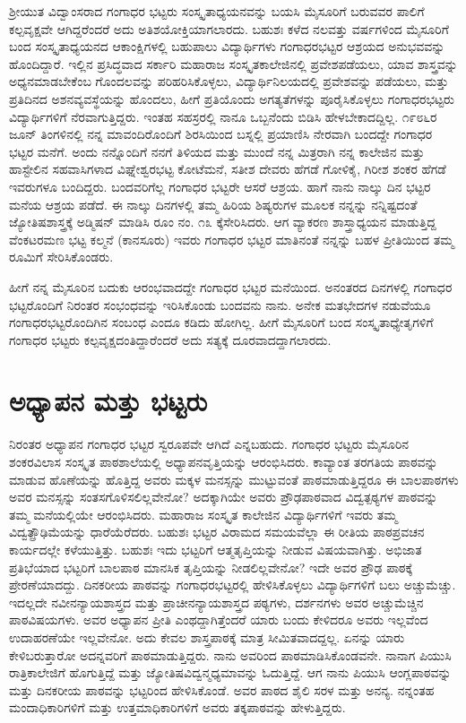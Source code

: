 {ಶ್ರೀಯುತ ವಿದ್ವಾಂಸರಾದ ಗಂಗಾಧರ ಭಟ್ಟರು ಸಂಸ್ಕೃತಾಧ್ಯಯನವನ್ನು ಬಯಸಿ ಮೈಸೂರಿಗೆ ಬರುವವರ ಪಾಲಿಗೆ ಕಲ್ಪವೃಕ್ಷವೇ ಆಗಿದ್ದರೆಂದರೆ ಅದು ಅತಿಶಯೋಕ್ತಿಯಾಗಲಾರದು. ಬಹುಶಃ ಕಳೆದ ನಲವತ್ತು ವರ್ಷಗಳಿಂದ ಮೈಸೂರಿಗೆ ಬಂದ ಸಂಸ್ಕೃತಾಧ್ಯಯನದ ಆಕಾಂಕ್ಷಿಗಳಲ್ಲಿ ಬಹುಪಾಲು ವಿದ್ಯಾರ್ಥಿಗಳು ಗಂಗಾಧರಭಟ್ಟರ ಆಶ್ರಯದ ಅನುಭವವನ್ನು ಹೊಂದಿದ್ದಾರೆ. ಇಲ್ಲಿನ ಪ್ರಸಿದ್ಧವಾದ ಸರ್ಕಾರಿ ಮಹಾರಾಜ ಸಂಸ್ಕೃತಕಾಲೇಜಿನಲ್ಲಿ ಪ್ರವೇಶಪಡೆಯಲು, ಯಾವ ಶಾಸ್ತ್ರವನ್ನು ಅಧ್ಯನಮಾಡಬೇಕೆಂಬ ಗೊಂದಲವನ್ನು ಪರಿಹರಿಸಿಕೊಳ್ಳಲು, ವಿದ್ಯಾರ್ಥಿನಿಲಯದಲ್ಲಿ ಪ್ರವೇಶವನ್ನು ಪಡೆಯಲು, ಮತ್ತು ಪ್ರತಿದಿನದ ಅಶನವ್ಯವಸ್ಥೆಯನ್ನು ಹೊಂದಲು, ಹೀಗೆ ಪ್ರತಿಯೊಂದು ಅಗತ್ಯತೆಗಳನ್ನು ಪೂರೈಸಿಕೊಳ್ಳಲು ಗಂಗಾಧರಭಟ್ಟರು ವಿದ್ಯಾರ್ಥಿಗಳಿಗೆ ನೆರವಾಗುತ್ತಿದ್ದರು. ಇಂತಹ ಸಹಸ್ರರಲ್ಲಿ ನಾನೂ ಒಬ್ಬನೆಂದು ಬಿಡಿಸಿ ಹೇಳಬೇಕಾದದ್ದಿಲ್ಲ. ೧೯೮೬ರ ಜೂನ್ ತಿಂಗಳಿನಲ್ಲಿ ನನ್ನ ಮಾವಂದಿರೊಂದಿಗೆ ಶಿರಸಿಯಿಂದ ಬಸ್ನಲ್ಲಿ ಪ್ರಯಾಣಿಸಿ ನೇರವಾಗಿ ಬಂದದ್ದೇ ಗಂಗಾಧರ ಭಟ್ಟರ ಮನೆಗೆ. ಅಂದು ನನ್ನೊಂದಿಗೆ ನನಗೆ ತಿಳಿಯದ ಮತ್ತು ಮುಂದೆ ನನ್ನ ಮಿತ್ರರಾಗಿ ನನ್ನ ಕಾಲೇಜಿನ ಮತ್ತು ಹಾಸ್ಟೇಲಿನ ಸಹವಾಸಿಗಳಾದ ವಿಘ್ನೇಶ್ವರಭಟ್ಟ ಕೋಟೆಮನೆ, ಸತೀಶ ದೇವರು ಹೆಗಡೆ ಗೋಳಿಕೈ, ಗಿರೀಶ ಶಂಕರ ಹೆಗಡೆ ಇವರುಗಳೂ ಬಂದಿದ್ದರು. ಬಂದವರಿಗೆಲ್ಲ ಗಂಗಾಧರ ಭಟ್ಟರೇ ಆಸರೆ  \enginline{-}  ಆಶ್ರಯ. ಹಾಗೆ ನಾನು ನಾಲ್ಕು ದಿನ ಭಟ್ಟರ ಮನೆಯ ಆಶ್ರಯ ಪಡೆದೆ. ಈ ನಾಲ್ಕು ದಿನಗಳಲ್ಲಿ ತಮ್ಮ ಹಿರಿಯ ಶಿಷ್ಯರುಗಳ ಮೂಲಕ ನನ್ನನ್ನು ನನ್ನಿಷ್ಟದಂತೆ ಜ್ಯೋತಿಷಶಾಸ್ತ್ರಕ್ಕೆ ಅಡ್ಮಿಷನ್ ಮಾಡಿಸಿ ರೂಂ ನಂ. ೧೩ ಕ್ಕೆಸೇರಿಸಿದರು. ಆಗ ವ್ಯಾಕರಣ ಶಾಸ್ತ್ರಾಧ್ಯಯನ ಮಾಡುತ್ತಿದ್ದ ವೆಂಕಟರಮಣ ಭಟ್ಟ ಕಲ್ಮನೆ (ಕಾನಸೂರು) ಇವರು ಗಂಗಾಧರ ಭಟ್ಟರ ಮಾತಿನಂತೆ ನನ್ನನ್ನು ಬಹಳ ಪ್ರೀತಿಯಿಂದ ತಮ್ಮ ರೂಮಿಗೆ ಸೇರಿಸಿಕೊಂಡರು. 

ಹೀಗೆ ನನ್ನ ಮೈಸೂರಿನ ಬದುಕು ಆರಂಭವಾದದ್ದೇ ಗಂಗಾಧರ ಭಟ್ಟರ ಮನೆಯಿಂದ. ಅನಂತರದ ದಿನಗಳಲ್ಲಿ ಗಂಗಾಧರ ಭಟ್ಟರೊಂದಿಗೆ ನಿರಂತರ ಸಂಭಂಧವನ್ನು ಇರಿಸಿಕೊಂಡು ಬಂದವನು ನಾನು. ಅನೇಕ ಮತಭೇದಗಳ ನಡುವೆಯೂ ಗಂಗಾಧರಭಟ್ಟರೊಂದಿಗಿನ ಸಂಬಂಧ ಎಂದೂ ಕಡಿದು ಹೋಗಿಲ್ಲ. ಹೀಗೆ ಮೈಸೂರಿಗೆ ಬಂದ ಸಂಸ್ಕೃತಾಧ್ಯೇತೃಗಳಿಗೆ ಗಂಗಾಧರ ಭಟ್ಟರು ಕಲ್ಪವೃಕ್ಷದಂತಿದ್ದಾರೆಂದರೆ ಅದು ಸತ್ಯಕ್ಕೆ ದೂರವಾದದ್ದಾಗಲಾರದು.

\section*{ಅಧ್ಯಾಪನ ಮತ್ತು ಭಟ್ಟರು}

ನಿರಂತರ ಅಧ್ಯಾಪನ ಗಂಗಾಧರ ಭಟ್ಟರ ಸ್ವರೂಪವೇ ಆಗಿದೆ ಎನ್ನಬಹುದು. ಗಂಗಾಧರ ಭಟ್ಟರು ಮೈಸೂರಿನ ಶಂಕರವಿಲಾಸ ಸಂಸ್ಕೃತ ಪಾಠಶಾಲೆಯಲ್ಲಿ ಅಧ್ಯಾಪನವೃತ್ತಿಯನ್ನು ಆರಂಭಿಸಿದರು. ಕಾವ್ಯಾಂತ ತರಗತಿಯ ಪಾಠವನ್ನು ಮಾಡುವ ಹೊಣೆಯನ್ನು ಹೊತ್ತಿದ್ದ ಅವರು ಮಕ್ಕಳ ಮನಸ್ಸನ್ನು ಮುಟ್ಟುವಂತೆ ಪಾಠಮಾಡುತ್ತಿದ್ದರೂ ಈ ಬಾಲಪಾಠಗಳು ಅವರ ಮನಸ್ಸನ್ನು ಸಂತಸಗೊಳಿಸಲಿಲ್ಲವೇನೋ? ಅದಕ್ಕಾಗಿಯೇ ಅವರು ಪ್ರೌಢಪಾಠವಾದ ವಿದ್ವತ್ಪಠ್ಯಗಳ ಪಾಠವನ್ನು ತಮ್ಮ ಮನೆಯಲ್ಲಿಯೇ ಆರಂಭಿಸಿದರು. ಮಹಾರಾಜ ಸಂಸ್ಕೃತ ಕಾಲೇಜಿನ ವಿದ್ಯಾರ್ಥಿಗಳಿಗೆ ಇವರು ತಮ್ಮ ವಿದ್ವತ್ಪ್ರೌಢಿಮೆಯನ್ನು ಧಾರೆಯೆರೆದರು. ಬಹುಶಃ ಭಟ್ಟರ ವಿರಾಮದ ಸಮಯವೆಲ್ಲಾ ಈ ರೀತಿಯ ಪಾಠಪ್ರವಚನ ಕಾರ್ಯದಲ್ಲೇ ಕಳೆಯುತ್ತಿತ್ತು. ಬಹುಶಃ ಇದು ಭಟ್ಟರಿಗೆ ಆತ್ಮತೃಪ್ತಿಯನ್ನು ನೀಡುವ ವಿಷಯವಾಗಿತ್ತು. ಅಭಿಜಾತ ಪ್ರತಿಭೆಯಾದ ಭಟ್ಟರಿಗೆ ಬಾಲಪಾಠ ಮಾನಸಿಕ ತೃಪ್ತಿಯನ್ನು ನೀಡಲಿಲ್ಲವೇನೋ? ಇದೇ ಅವರ ಪ್ರೌಢ ಪಾಠಕ್ಕೆ ಪ್ರೇರಣೆಯಾದದ್ದು. ದಿನಕರೀಯ ಪಾಠವನ್ನು ಗಂಗಾಧರಭಟ್ಟರಲ್ಲಿ ಹೇಳಿಸಿಕೊಳ್ಳಲು ವಿದ್ಯಾರ್ಥಿಗಳಿಗೆ ಬಲು ಅಚ್ಚುಮೆಚ್ಚು. ಇದಲ್ಲದೇ ನವೀನನ್ಯಾಯಶಾಸ್ತ್ರದ ಮತ್ತು ಪ್ರಾಚೀನನ್ಯಾಯಶಾಸ್ತ್ರದ ಪಠ್ಯಗಳು, ದರ್ಶನಗಳು ಅವರ ಅಚ್ಚುಮೆಚ್ಚಿನ ಪಾಠವಿಷಯಗಳು. ಅವರ ಅಧ್ಯಾಪನ ಪ್ರೀತಿ ಎಂಥದ್ದಾಗಿತ್ತೆಂದರೆ ಯಾರು ಬಂದು ಕೇಳಿದರೂ ಅವರು ಇಲ್ಲವೆಂದ ಉದಾಹರಣೆಯೇ ಇಲ್ಲವೇನೋ. ಅದು ಕೇವಲ ಶಾಸ್ತ್ರಪಾಠಕ್ಕೆ ಮಾತ್ರ ಸೀಮಿತವಾದದ್ದಲ್ಲ. ಏನನ್ನು ಯಾರು ಕೇಳಿಬರುತ್ತಾರೋ ಅದನ್ನವರಿಗೆ ಪಾಠಮಾಡುತ್ತಿದ್ದರು. ನಾನು ಅವರಿಂದ ಪಾಠಮಾಡಿಸಿಕೊಂಡವನೇ. ನಾನಾಗ ಪಿಯುಸಿ ರಾತ್ರಿಕಾಲೇಜಿಗೆ ಹೊಗುತ್ತಿದ್ದೆ ಮತ್ತು ಜ್ಯೋತಿಷವಿದ್ವನ್ಮಧ್ಯಮಾವನ್ನು ಓದುತ್ತಿದ್ದೆ. ಆಗ ನಾನು ಪಿಯುಸಿ ಆಂಗ್ಲಪಾಠವನ್ನು ಮತ್ತು ದಿನಕರೀಯ ಪಾಠವನ್ನು ಭಟ್ಟರಿಂದ ಹೇಳಿಸಿಕೊಂಡೆ. ಅವರ ಪಾಠದ ಶೈಲಿ ಸರಳ ಮತ್ತು ಅನನ್ಯ. ನನ್ನಂತಹ ಮಂದಾಧಿಕಾರಿಗಳಿಗೆ ಮತ್ತು ಉತ್ತಮಾಧಿಕಾರಿಗಳಿಗೆ ಅವರು ತಕ್ಕಪಾಠವನ್ನು ಹೇಳುತ್ತಿದ್ದರು.

}
